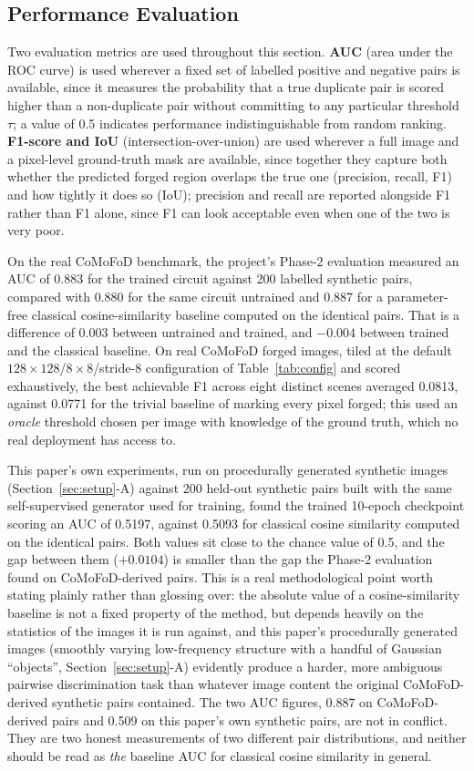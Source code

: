 \documentclass[conference]{IEEEtran}
\begin{document}
\subsection{Performance Evaluation}\label{sec:performance}
Two evaluation metrics are used throughout this section. \textbf{AUC} (area under the ROC curve) is used wherever a fixed set of labelled positive and negative pairs is available, since it measures the probability that a true duplicate pair is scored higher than a non-duplicate pair without committing to any particular threshold $\tau$; a value of 0.5 indicates performance indistinguishable from random ranking. \textbf{F1-score and IoU} (intersection-over-union) are used wherever a full image and a pixel-level ground-truth mask are available, since together they capture both whether the predicted forged region overlaps the true one (precision, recall, F1) and how tightly it does so (IoU); precision and recall are reported alongside F1 rather than F1 alone, since F1 can look acceptable even when one of the two is very poor.

On the real CoMoFoD benchmark, the project's Phase-2 evaluation measured an AUC of 0.883 for the trained circuit against 200 labelled synthetic pairs, compared with 0.880 for the same circuit untrained and 0.887 for a parameter-free classical cosine-similarity baseline computed on the identical pairs. That is a difference of 0.003 between untrained and trained, and $-0.004$ between trained and the classical baseline. On real CoMoFoD forged images, tiled at the default $128\times128$/$8\times8$/stride-8 configuration of Table~\ref{tab:config} and scored exhaustively, the best achievable F1 across eight distinct scenes averaged 0.0813, against 0.0771 for the trivial baseline of marking every pixel forged; this used an \emph{oracle} threshold chosen per image with knowledge of the ground truth, which no real deployment has access to.

This paper's own experiments, run on procedurally generated synthetic images (Section~\ref{sec:setup}-A) against 200 held-out synthetic pairs built with the same self-supervised generator used for training, found the trained 10-epoch checkpoint scoring an AUC of 0.5197, against 0.5093 for classical cosine similarity computed on the identical pairs. Both values sit close to the chance value of 0.5, and the gap between them ($+0.0104$) is smaller than the gap the Phase-2 evaluation found on CoMoFoD-derived pairs. This is a real methodological point worth stating plainly rather than glossing over: the absolute value of a cosine-similarity baseline is not a fixed property of the method, but depends heavily on the statistics of the images it is run against, and this paper's procedurally generated images (smoothly varying low-frequency structure with a handful of Gaussian ``objects'', Section~\ref{sec:setup}-A) evidently produce a harder, more ambiguous pairwise discrimination task than whatever image content the original CoMoFoD-derived synthetic pairs contained. The two AUC figures, 0.887 on CoMoFoD-derived pairs and 0.509 on this paper's own synthetic pairs, are not in conflict. They are two honest measurements of two different pair distributions, and neither should be read as \emph{the} baseline AUC for classical cosine similarity in general.
\end{document}

